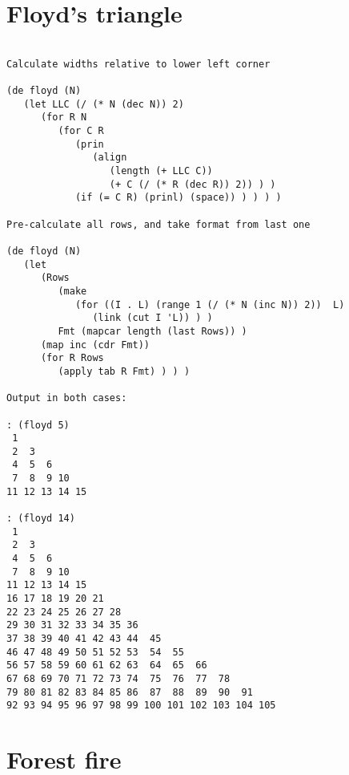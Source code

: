 \section*{Floyd's triangle}

\begin{verbatim}

Calculate widths relative to lower left corner

(de floyd (N)
   (let LLC (/ (* N (dec N)) 2)
      (for R N
         (for C R
            (prin
               (align
                  (length (+ LLC C))
                  (+ C (/ (* R (dec R)) 2)) ) )
            (if (= C R) (prinl) (space)) ) ) ) )

Pre-calculate all rows, and take format from last one

(de floyd (N)
   (let
      (Rows
         (make
            (for ((I . L) (range 1 (/ (* N (inc N)) 2))  L)
               (link (cut I 'L)) ) )
         Fmt (mapcar length (last Rows)) )
      (map inc (cdr Fmt))
      (for R Rows
         (apply tab R Fmt) ) ) )

Output in both cases:

: (floyd 5)
 1
 2  3
 4  5  6
 7  8  9 10
11 12 13 14 15

: (floyd 14)
 1
 2  3
 4  5  6
 7  8  9 10
11 12 13 14 15
16 17 18 19 20 21
22 23 24 25 26 27 28
29 30 31 32 33 34 35 36
37 38 39 40 41 42 43 44  45
46 47 48 49 50 51 52 53  54  55
56 57 58 59 60 61 62 63  64  65  66
67 68 69 70 71 72 73 74  75  76  77  78
79 80 81 82 83 84 85 86  87  88  89  90  91
92 93 94 95 96 97 98 99 100 101 102 103 104 105

\end{verbatim}

\section*{Forest fire}

